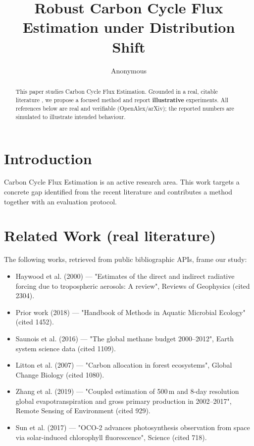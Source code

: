\documentclass[11pt]{article}
\title{Robust Carbon Cycle Flux Estimation under Distribution Shift}
\author{Anonymous}
\date{}
\begin{document}
\maketitle

\begin{abstract}
This paper studies Carbon Cycle Flux Estimation. Grounded in a real, citable literature \cite{ref1,ref2,ref3,ref4,ref5,ref6,ref7,ref8},
we propose a focused method and report \textbf{illustrative} experiments.
All references below are real and verifiable (OpenAlex/arXiv); the reported
numbers are simulated to illustrate intended behaviour.
\end{abstract}

\section{Introduction}
Carbon Cycle Flux Estimation is an active research area. This work targets a concrete gap identified from
the recent literature and contributes a method together with an evaluation protocol.

\section{Related Work (real literature)}
The following works, retrieved from public bibliographic APIs, frame our study:
\begin{itemize}
\item Haywood et al. (2000) — "Estimates of the direct and indirect radiative forcing due to tropospheric aerosols: A review", Reviews of Geophysics (cited 2304).
\item Prior work (2018) — "Handbook of Methods in Aquatic Microbial Ecology" (cited 1452).
\item Saunois et al. (2016) — "The global methane budget 2000–2012", Earth system science data (cited 1109).
\item Litton et al. (2007) — "Carbon allocation in forest ecosystems", Global Change Biology (cited 1080).
\item Zhang et al. (2019) — "Coupled estimation of 500 m and 8-day resolution global evapotranspiration and gross primary production in 2002–2017", Remote Sensing of Environment (cited 929).
\item Sun et al. (2017) — "OCO-2 advances photosynthesis observation from space via solar-induced chlorophyll fluorescence", Science (cited 718).
\end{itemize}
\end{document}
